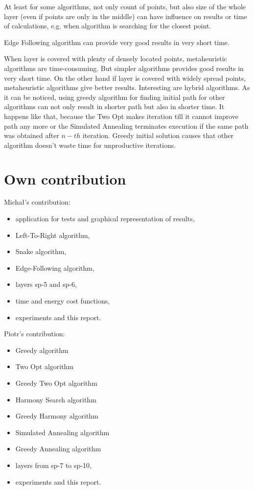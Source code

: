 \documentclass[titlepage]{article}
\begin{document}
At least for some algorithms, not only count of points, but also size of the whole layer (even if points are only in the middle) can have influence on results or time of calculations, e.g. when algorithm is searching for the closest point.

Edge Following algorithm can provide very good results in very short time.

When layer is covered with plenty of densely located points, metaheuristic algorithms are time-consuming. But simpler  algorithms provides good results in very short time. On the other hand if layer is covered with widely spread points, metaheuristic algorithms give better results. Interesting are hybrid algorithms. As it can be noticed, using greedy algorithm for finding initial path for other algorithms can not only result in shorter path but also in shorter time. It happens like that, because the Two Opt makes iteration till it cannot improve path any more or the Simulated Annealing terminates execution if the same path was obtained after $n-th$ iteration. Greedy initial solution causes that other algorithm doesn't waste time for unproductive iterations.

\section{Own contribution}
Michał's contribution:
\begin{itemize}
\item application for tests and graphical representation of results,
\item Left-To-Right algorithm,
\item Snake algorithm,
\item Edge-Following algorithm,
\item layers sp-5 and sp-6,
\item time and energy cost functions,
\item experiments and this report.
\end{itemize}
Piotr's contribution:
\begin{itemize}
\item Greedy algorithm
\item Two Opt algorithm
\item Greedy Two Opt algorithm
\item Harmony Search algorithm
\item Greedy Harmony algorithm
\item Simulated Annealing algorithm
\item Greedy Annealing algorithm
\item layers from sp-7 to sp-10,
\item experiments and this report. 
\end{itemize}

\nocite{*}



\newpage



\newpage

\listoffigures

\newpage
\listoftables
\end{document}
